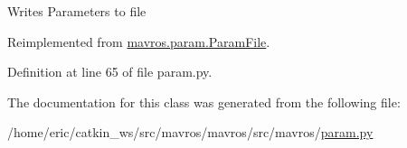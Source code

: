 \begin{DoxyVerb}Writes Parameters to file\end{DoxyVerb}
 

Reimplemented from \mbox{\hyperlink{classmavros_1_1param_1_1ParamFile_ad1027ff8e4ed8681f36e096447d110bb}{mavros.\+param.\+Param\+File}}.



Definition at line 65 of file param.\+py.



The documentation for this class was generated from the following file\+:\begin{DoxyCompactItemize}
\item 
/home/eric/catkin\+\_\+ws/src/mavros/mavros/src/mavros/\mbox{\hyperlink{param_8py}{param.\+py}}\end{DoxyCompactItemize}
